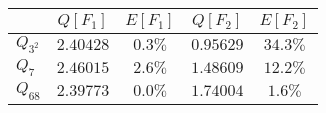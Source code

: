 \begin{tabular}{l|cccc}

&$Q[F_1]$&$E[F_1]$&$Q[F_2]$&$E[F_2]$\\\hline
$Q_{3^2}$&$2.40428$&$0.3\%$&$0.95629$&$34.3\%$\\
$Q_{7}$&$2.46015$&$2.6\%$&$1.48609$&$12.2\%$\\
$Q_{68}$&$2.39773$&$0.0\%$&$1.74004$&$1.6\%$\\
\end{tabular}
